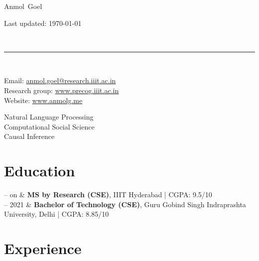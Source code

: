 \documentclass[10pt, a4paper]{article}
\makeatletter
\newcommand{\FirstName}{Anmol}
\newcommand{\LastName}{Goel}
\newcommand{\MyName}{\FirstName\ \LastName}
\newcommand{\Email}{anmol.goel@research.iiit.ac.in}
\newcommand{\PersonalWebsite}{www.anmolg.me}
\newcommand{\LabWebsite}{www.precog.iiit.ac.in}
\newcommand{\ORCID}{0000-0001-6123-9515}
\newcommand{\Website}[1]{\href{https://#1}{#1}}
\newcommand{\Duration}[2]{\fontsize{9pt}{0}\selectfont #1 -- #2}
\newcommand{\Ongoing}{on}
\makeatother
\begin{document}
\thispagestyle{empty}

\begin{minipage}[t]{0.7\textwidth}
{\fontsize{22pt}{0}\selectfont\MyName}
\end{minipage}
\begin{minipage}[t]{0.3\textwidth}
  \begin{flushright}
    Last updated: \monthyear\today
  \end{flushright}
\end{minipage}
\\[-0.1cm]
\rule{\textwidth}{2pt}
\\[0.1cm]
\begin{minipage}[t]{0.7\textwidth}
    Email: \href{mailto:\Email}{\Email}
    \\
    Research group: \Website{\LabWebsite}
    \\
    Website: \Website{\PersonalWebsite}
\end{minipage}
\begin{minipage}[t]{0.3\textwidth}
  \begin{flushright}
    Natural Language Processing \\ 
    Computational Social Science \\
    Causal Inference
  \end{flushright}
\end{minipage}



\section{Education}

\begin{EntriesTable}
  \Duration{2022}{\Ongoing}  &
  \textbf{MS by Research (CSE)}, IIIT Hyderabad | CGPA: 9.5/10
  \\
  \Duration{2017}{2021}  &
  \textbf{Bachelor of Technology (CSE)}, Guru Gobind Singh Indraprashta University, Delhi | CGPA: 8.85/10 
\end{EntriesTable}


\section{Experience}
\end{document}
